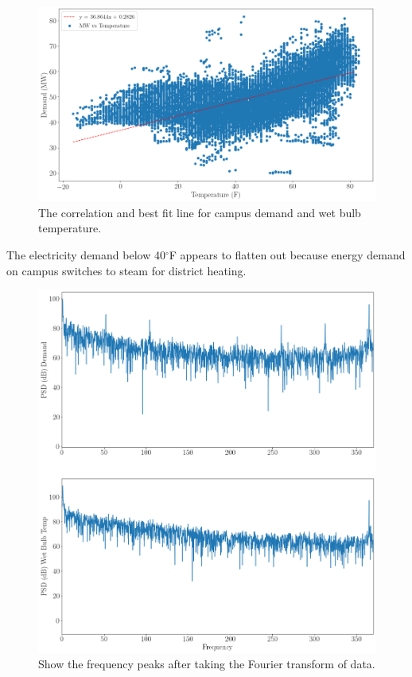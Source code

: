 \begin{figure}[H]
  \centering
  \includegraphics[width=\textwidth]{demandtempcorr}
  \caption{The correlation and best fit line for campus demand and wet bulb
  temperature.}
  \label{fig:tempcorrelation}
\end{figure}

The electricity demand below 40$^\circ$F appears to flatten out because energy
demand on campus switches to steam for district heating. 

\begin{figure}[H]
  \centering
  \includegraphics[width=\textwidth]{demandtempfreq}
  \caption{Show the frequency peaks after taking the Fourier transform of data.}
  \label{fig:demandfreq}
\end{figure}

